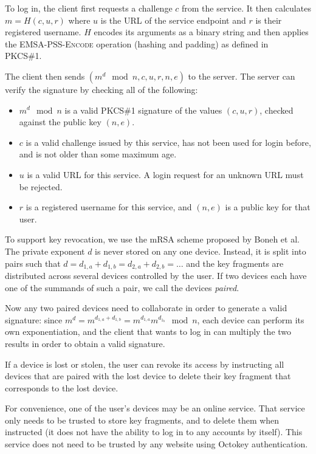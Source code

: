 \documentclass{article}
\begin{document}
To log in, the client first requests a challenge $c$ from the service. It then calculates
$m = H(c, u, r)$ where $u$ is the URL of the service endpoint and $r$ is their registered username.
$H$ encodes its arguments as a binary string and then applies the \textsc{EMSA-PSS-Encode} operation
(hashing and padding) as defined in PKCS\#1.~\cite{PKCS1}

The client then sends $(m^d \mod n, c, u, r, n, e)$ to the server. The server can verify the
signature by checking all of the following:

\begin{itemize}
\item $m^d \mod n$ is a valid PKCS\#1 signature of the values $(c, u, r)$, checked against the
public key $(n, e)$.
\item $c$ is a valid challenge issued by this service, has not been used for login before, and is
not older than some maximum age.
\item $u$ is a valid URL for this service. A login request for an unknown URL must be rejected.
\item $r$ is a registered username for this service, and $(n, e)$ is a public key for that user.
\end{itemize}

To support key revocation, we use the mRSA scheme proposed by Boneh et al.~\cite{Boneh01} The
private exponent $d$ is never stored on any one device. Instead, it is split into pairs such that
$d = d_{1,a} + d_{1,b} = d_{2,a} + d_{2,b} = \dots$ and the key fragments are distributed across
several devices controlled by the user. If two devices each have one of the summands of such a pair,
we call the devices \emph{paired}.

Now any two paired devices need to collaborate in order to generate a valid signature: since
$m^d = m^{d_{1,a} + d_{1,b}} = m^{d_{1,a}} m^{d_{1_b}} \mod n$, each device can perform its own
exponentiation, and the client that wants to log in can multiply the two results in order to obtain
a valid signature.

If a device is lost or stolen, the user can revoke its access by instructing all devices that are
paired with the lost device to delete their key fragment that corresponds to the lost device.

For convenience, one of the user's devices may be an online service. That service only needs to be
trusted to store key fragments, and to delete them when instructed (it does not have the ability to
log in to any accounts by itself). This service does not need to be trusted by any website using
Octokey authentication.

{}

\end{document}
